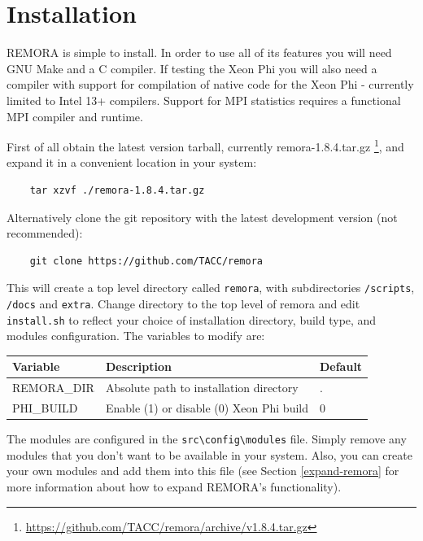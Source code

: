 \documentclass[10pt,a4paper]{report}
\begin{document}
\chapter{Installation}
REMORA is simple to install. In order to use all of its features you will need GNU Make and a C compiler. If testing the Xeon Phi you will also need a compiler with support for compilation of native code for the Xeon Phi - currently limited to Intel 13+ compilers. Support for MPI statistics requires a functional MPI compiler and runtime.

First of all obtain the latest version tarball, currently remora-1.8.4.tar.gz \footnote{\href{https://github.com/TACC/remora/archive/v1.8.4.tar.gz}{https://github.com/TACC/remora/archive/v1.8.4.tar.gz}}, and expand it in a convenient location in your system:

\begin{verbatim}
    tar xzvf ./remora-1.8.4.tar.gz
\end{verbatim}

Alternatively clone the git repository with the latest development version (not recommended):

\begin{verbatim}
    git clone https://github.com/TACC/remora
\end{verbatim}

This will create a top level directory called \verb+remora+, with subdirectories \verb+/scripts+, \verb+/docs+ and \verb+extra+. Change directory to the top level of remora and edit \verb+install.sh+ to reflect your choice of installation directory, build type, and modules configuration. The variables to modify are:

\begin{table}[h]
\centering
\label{tab:env}
\begin{tabular}{|l|l|l|}
\hline
\bf{Variable}	& \bf{Description}                          & \bf{Default}\\\hline
REMORA\_DIR     & Absolute path to installation directory   & . \\\hline
PHI\_BUILD      & Enable (1) or disable (0) Xeon Phi build  & 0 \\\hline
\end{tabular}
\end{table}

The modules are configured in the \verb+src\config\modules+ file. Simply remove any modules that you don't want to be available in your system. Also, you can create your own modules and add them into this file (see Section \ref{expand-remora} for more information about how to expand REMORA's functionality).
\end{document}
